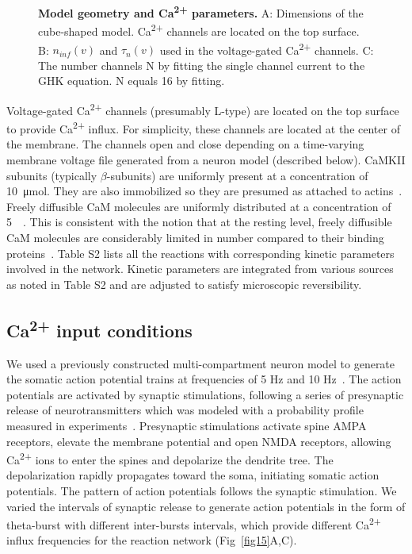 \documentclass[10pt,letterpaper]{article}
\begin{document}
\begin{figure}[!h]
	\caption{{\bf Model geometry and Ca\textsuperscript{2+} parameters.}
	A: Dimensions of the cube-shaped model. Ca\textsuperscript{2+} channels are located on the top surface. 
	B: $n_{inf}(v)$ and $\tau_n(v)$ used in the voltage-gated Ca\textsuperscript{2+} channels.
	C: The number channels N by fitting the single channel current to the GHK equation. N equals 16 by fitting. 
	}
\label{fig14}
\end{figure}

Voltage-gated Ca\textsuperscript{2+} channels (presumably L-type) are located on the top surface to provide Ca\textsuperscript{2+} influx. For simplicity, these channels are located at the center of the membrane. The channels open and close depending on a time-varying membrane voltage file generated from a neuron model (described below). CaMKII subunits (typically $\beta$-subunits) are uniformly present at a concentration of \SI{10}{\umol}. They are also immobilized so they are presumed as attached to actins~\cite{Li:2016cq}. Freely diffusible CaM molecules are uniformly distributed at a concentration of \SI{5}{\micro\Molar}. This is consistent with the notion that at the resting level, freely diffusible CaM molecules are considerably limited in number compared to their binding proteins~\cite{Tran:2003fs,2008BpJ....95.6002S,LubyPhelps:1995kl}. Table S2 lists all the reactions with corresponding kinetic parameters involved in the network. Kinetic parameters are integrated from various sources as noted in Table S2 and are adjusted to satisfy microscopic reversibility. 

\subsection*{Ca\textsuperscript{2+} input conditions}


We used a previously constructed multi-compartment neuron model to generate the somatic action potential trains at frequencies of 5 Hz and 10 Hz~\cite{Li:2014fv}. The action potentials are activated by synaptic stimulations, following a series of presynaptic release of neurotransmitters which was modeled with a probability profile measured in experiments~\cite{Grover:2009hb}. Presynaptic stimulations activate spine AMPA receptors, elevate the membrane potential and open NMDA receptors, allowing Ca\textsuperscript{2+} ions to enter the spines and depolarize the dendrite tree. The depolarization rapidly propagates toward the soma, initiating somatic action potentials. The pattern of action potentials follows the synaptic stimulation. We varied the intervals of synaptic release to generate action potentials in the form of theta-burst with different inter-bursts intervals, which provide different Ca\textsuperscript{2+} influx frequencies for the reaction network (Fig~\ref{fig15}A,C).
\end{document}
